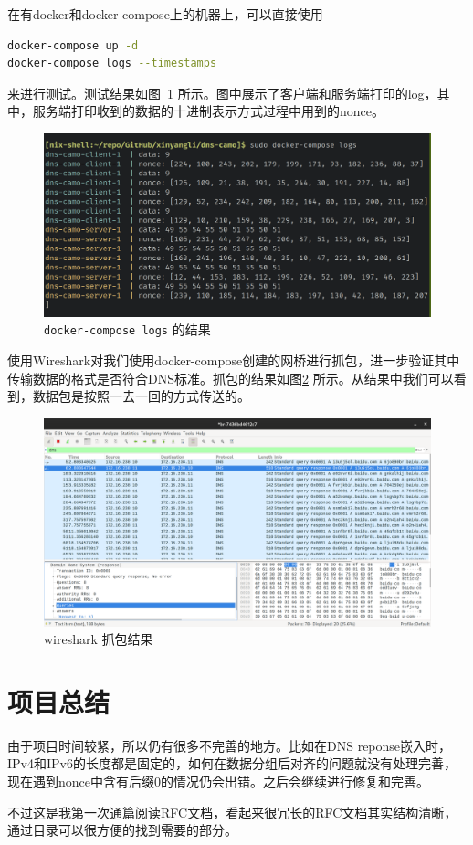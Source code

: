 \documentclass[UTF8]{ctexart}
\begin{document}
	在有docker和docker-compose上的机器上，可以直接使用
	
	\begin{lstlisting}[language=bash]
docker-compose up -d
docker-compose logs --timestamps
	\end{lstlisting}

	来进行测试。测试结果如图~\ref{fig:docker_logs} 所示。图中展示了客户端和服务端打印的log，其中，服务端打印收到的数据的十进制表示方式过程中用到的nonce。

	\begin{figure}[h]
		\centering
		\includegraphics[width=12cm]{images/docker_logs.png}
		\caption{\lstinline{docker-compose logs} 的结果}
		\label{fig:docker_logs}
	\end{figure}
	
	使用Wireshark对我们使用docker-compose创建的网桥进行抓包，进一步验证其中传输数据的格式是否符合DNS标准。抓包的结果如图\ref{fig:wireshark} 所示。从结果中我们可以看到，数据包是按照一去一回的方式传送的。

	\begin{figure}[h]
		\centering
		\includegraphics[width=12cm]{images/wireshark.png}
		\caption{wireshark 抓包结果}
		\label{fig:wireshark}
	\end{figure}

	\section{项目总结}

	由于项目时间较紧，所以仍有很多不完善的地方。比如在DNS reponse嵌入时，IPv4和IPv6的长度都是固定的，如何在数据分组后对齐的问题就没有处理完善，现在遇到nonce中含有后缀0的情况仍会出错。之后会继续进行修复和完善。

	不过这是我第一次通篇阅读RFC文档，看起来很冗长的RFC文档其实结构清晰，通过目录可以很方便的找到需要的部分。
\end{document}
